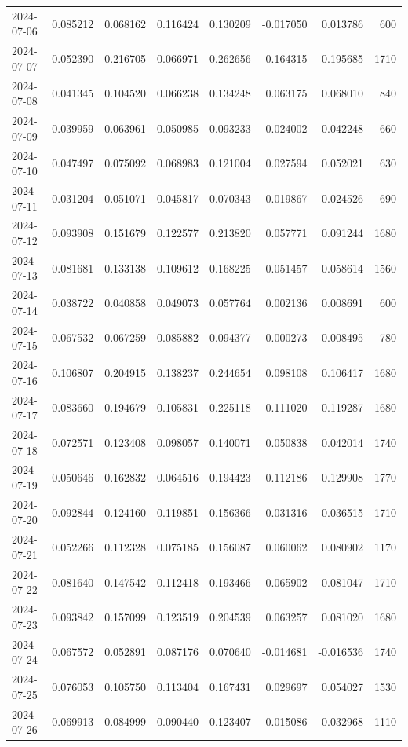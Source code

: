\begin{tabular}{lrrrrrrr}
2024-07-06 & 0.085212 & 0.068162 & 0.116424 & 0.130209 & -0.017050 & 0.013786 & 600 \\
2024-07-07 & 0.052390 & 0.216705 & 0.066971 & 0.262656 & 0.164315 & 0.195685 & 1710 \\
2024-07-08 & 0.041345 & 0.104520 & 0.066238 & 0.134248 & 0.063175 & 0.068010 & 840 \\
2024-07-09 & 0.039959 & 0.063961 & 0.050985 & 0.093233 & 0.024002 & 0.042248 & 660 \\
2024-07-10 & 0.047497 & 0.075092 & 0.068983 & 0.121004 & 0.027594 & 0.052021 & 630 \\
2024-07-11 & 0.031204 & 0.051071 & 0.045817 & 0.070343 & 0.019867 & 0.024526 & 690 \\
2024-07-12 & 0.093908 & 0.151679 & 0.122577 & 0.213820 & 0.057771 & 0.091244 & 1680 \\
2024-07-13 & 0.081681 & 0.133138 & 0.109612 & 0.168225 & 0.051457 & 0.058614 & 1560 \\
2024-07-14 & 0.038722 & 0.040858 & 0.049073 & 0.057764 & 0.002136 & 0.008691 & 600 \\
2024-07-15 & 0.067532 & 0.067259 & 0.085882 & 0.094377 & -0.000273 & 0.008495 & 780 \\
2024-07-16 & 0.106807 & 0.204915 & 0.138237 & 0.244654 & 0.098108 & 0.106417 & 1680 \\
2024-07-17 & 0.083660 & 0.194679 & 0.105831 & 0.225118 & 0.111020 & 0.119287 & 1680 \\
2024-07-18 & 0.072571 & 0.123408 & 0.098057 & 0.140071 & 0.050838 & 0.042014 & 1740 \\
2024-07-19 & 0.050646 & 0.162832 & 0.064516 & 0.194423 & 0.112186 & 0.129908 & 1770 \\
2024-07-20 & 0.092844 & 0.124160 & 0.119851 & 0.156366 & 0.031316 & 0.036515 & 1710 \\
2024-07-21 & 0.052266 & 0.112328 & 0.075185 & 0.156087 & 0.060062 & 0.080902 & 1170 \\
2024-07-22 & 0.081640 & 0.147542 & 0.112418 & 0.193466 & 0.065902 & 0.081047 & 1710 \\
2024-07-23 & 0.093842 & 0.157099 & 0.123519 & 0.204539 & 0.063257 & 0.081020 & 1680 \\
2024-07-24 & 0.067572 & 0.052891 & 0.087176 & 0.070640 & -0.014681 & -0.016536 & 1740 \\
2024-07-25 & 0.076053 & 0.105750 & 0.113404 & 0.167431 & 0.029697 & 0.054027 & 1530 \\
2024-07-26 & 0.069913 & 0.084999 & 0.090440 & 0.123407 & 0.015086 & 0.032968 & 1110 \\

\end{tabular}
